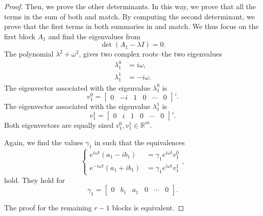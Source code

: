 \begin{proof}
Then, we prove the other determinants. In this way, we prove that all the terms in the sum of both  and  match. 
By computing the second determinant, we prove that the first terms in both summaries in  and  match. We thus focus on the first block $A_1$ and find the eigenvalues from 
\begin{equation}\label{eq:det-aj}
  \det(A_1-\lambda I)=0.
\end{equation}
The polynomial $\lambda^2+\omega^2$, gives two complex roots--the two eigenvalues
\begin{subequations}\begin{align}
  \lambda_1^0&=i\omega,\\
  \lambda_1^1&=-i\omega.
\end{align}
\end{subequations}
The eigenvector associated with the eigenvalue $\lambda_1^0$ is 
\begin{equation}
  v_1^0=\begin{bmatrix}0 & -i&1&0&\cdots&0\end{bmatrix}'.  
\end{equation}
The eigenvector associated with the eigenvalue $\lambda_1^1$ is 
\begin{equation}
  v_1^1=\begin{bmatrix}0&i&1&0&\cdots&0\end{bmatrix}'. 
\end{equation}
Both eigenvectors are equally sized $v_1^0,v_1^1\in\mathbb{R}^m$.

Again, we find the values $\gamma_1$ in  such that the equivalences 
\begin{equation}\begin{cases}    
  e^{i\omega t}(a_1-ib_1)&=\gamma_1 e^{i\omega t}v_1^0\\
  e^{-i\omega t}(a_1+ib_1)&=\gamma_1 e^{i\omega t}v_1^1
\end{cases},\end{equation}
hold. They hold for 
\begin{equation}
  \gamma_1=\begin{bmatrix}0&b_1&a_1&0&\cdots&0\end{bmatrix}.
\end{equation} 

The proof for the remaining $r-1$ blocks is equivalent.


\end{proof}
